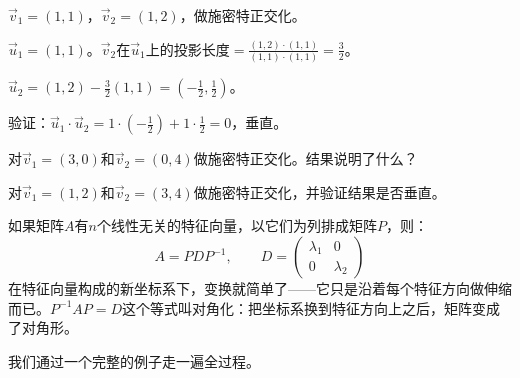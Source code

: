 \begin{example}
$\vec v_1=(1,1)$，$\vec v_2=(1,2)$，做施密特正交化。
\end{example}
\begin{solution}
$\vec u_1=(1,1)$。$\vec v_2$在$\vec u_1$上的投影长度$=\frac{(1,2)\cdot(1,1)}{(1,1)\cdot(1,1)}=\frac{3}{2}$。

$\vec u_2=(1,2)-\frac32(1,1)=(-\frac12,\frac12)$。

验证：$\vec u_1\cdot\vec u_2=1\cdot(-\frac12)+1\cdot\frac12=0$，垂直。
\end{solution}

\begin{exercise}
\item 对$\vec v_1=(3,0)$和$\vec v_2=(0,4)$做施密特正交化。结果说明了什么？
\item 对$\vec v_1=(1,2)$和$\vec v_2=(3,4)$做施密特正交化，并验证结果是否垂直。
\end{exercise}


如果矩阵$A$有$n$个线性无关的特征向量，以它们为列排成矩阵$P$，则：
\[
A = PDP^{-1},\qquad D = \begin{pmatrix}\lambda_1&0\\0&\lambda_2\end{pmatrix}
\]
在特征向量构成的新坐标系下，变换就简单了——它只是沿着每个特征方向做伸缩而已。$P^{-1}AP=D$这个等式叫对角化：把坐标系换到特征方向上之后，矩阵变成了对角形。

我们通过一个完整的例子走一遍全过程。


